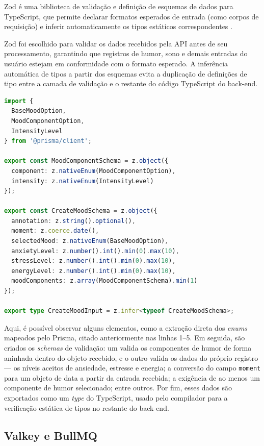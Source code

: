 Zod é uma biblioteca de validação e definição de esquemas de dados para
TypeScript, que permite declarar formatos esperados de entrada (como corpos
de requisição) e inferir automaticamente os tipos estáticos correspondentes
\citep{zod:2026}.

Zod foi escolhido para validar os dados recebidos pela API antes de seu
processamento, garantindo que registros de humor, sono e demais entradas do
usuário estejam em conformidade com o formato esperado. A inferência
automática de tipos a partir dos esquemas evita a duplicação de definições de
tipo entre a camada de validação e o restante do código TypeScript do
back-end.

\begin{lstlisting}[language=typescript, caption={Validação e Inferência usando Zod}, label={lst:zod-inference}]
import {
  BaseMoodOption,
  MoodComponentOption,
  IntensityLevel
} from '@prisma/client';

export const MoodComponentSchema = z.object({
  component: z.nativeEnum(MoodComponentOption),
  intensity: z.nativeEnum(IntensityLevel)
});

export const CreateMoodSchema = z.object({
  annotation: z.string().optional(),
  moment: z.coerce.date(),
  selectedMood: z.nativeEnum(BaseMoodOption),
  anxietyLevel: z.number().int().min(0).max(10),
  stressLevel: z.number().int().min(0).max(10),
  energyLevel: z.number().int().min(0).max(10),
  moodComponents: z.array(MoodComponentSchema).min(1)
});

export type CreateMoodInput = z.infer<typeof CreateMoodSchema>;
\end{lstlisting}


Aqui, é possível observar alguns elementos, como a extração direta dos
\textit{enums} mapeados pelo Prisma, citado anteriormente nas linhas 1--5. Em
seguida, são criados os \textit{schemas} de validação: um valida os componentes
de humor de forma aninhada dentro do objeto recebido, e o outro valida os dados
do próprio registro --- os níveis aceitos de ansiedade, estresse e energia; a
conversão do campo \texttt{moment} para um objeto de data a partir da entrada
recebida; a exigência de ao menos um componente de humor selecionado; entre
outros. Por fim, esses dados são exportados como um \textit{type} do
TypeScript, usado pelo compilador para a verificação estática de tipos no
restante do back-end.

\subsection{Valkey e BullMQ}

